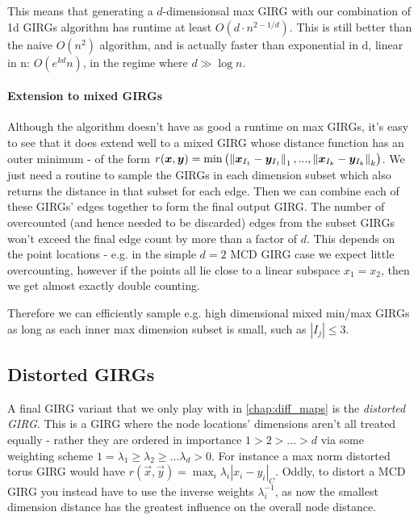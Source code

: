This means that generating a $d$-dimensionsal max GIRG with our combination of 1d GIRGs algorithm has runtime at least $O(d \cdot n^{2 - 1/d})$. This is still better than the naive $O(n^2)$ algorithm, and is actually faster than exponential in d, linear in n: $O(e^{kd} n)$, in the regime where $d \gg \log n$.


\paragraph{Extension to mixed GIRGs}
Although the algorithm doesn't have as good a runtime on max GIRGs, it's easy to see that it does extend well to a mixed GIRG whose distance function has an outer minimum - of the form $r(\bm{x}, \bm{y}) = \min \left ( \left\lVert \bm{x}_{I_1} - \bm{y}_{I_1}\right\rVert_1, ..., \left\lVert \bm{x}_{I_k} - \bm{y}_{I_k}\right\rVert_k  \right )$. We just need a routine to sample the GIRGs in each dimension subset which also returns the distance in that subset for each edge. Then we can combine each of these GIRGs' edges together to form the final output GIRG. The number of overcounted (and hence needed to be discarded) edges from the subset GIRGs won't exceed the final edge count by more than a factor of $d$. This depends on the point locations - e.g. in the simple $d=2$ MCD GIRG case we expect little overcounting, however if the points all lie close to a linear subspace $x_1 = x_2$, then we get almost exactly double counting.

Therefore we can efficiently sample e.g. high dimensional mixed min/max GIRGs as long as each inner max dimension subset is small, such as $|I_j| \leq 3$.



\subsection{Distorted GIRGs}
\label{subsec:distorted_girgs}
A final GIRG variant that we only play with in \cref{chap:diff_maps} is the \textit{distorted GIRG}. This is a GIRG where the node locations' dimensions aren't all treated equally - rather they are ordered in importance $1 > 2 > ... > d$ via some weighting scheme $1=\lambda_1 \geq \lambda_2 \geq ... \lambda_d > 0$. For instance a max norm distorted torus GIRG would have $r(\vec{x}, \vec{y}) = \max_i \lambda_i |x_i - y_i|_C$. Oddly, to distort a MCD GIRG you instead have to use the inverse weights $\lambda_i^{-1}$, as now the smallest dimension distance has the greatest influence on the overall node distance.

